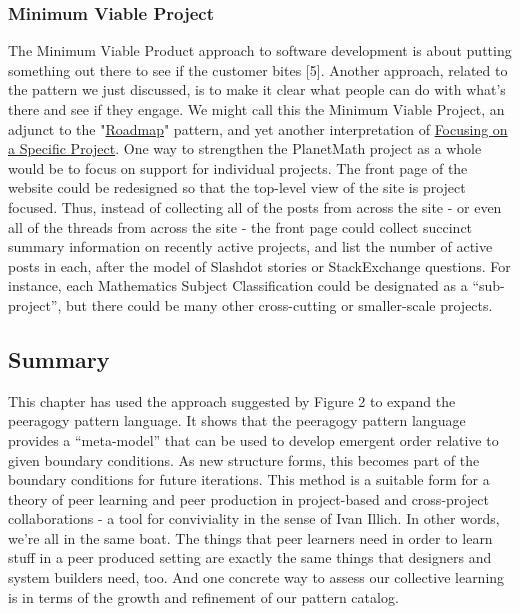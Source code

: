 \subsubsection{Minimum Viable Project}

The Minimum Viable Product approach to software development is about
putting something out there to see if the customer bites {[}5{]}.
Another approach, related to the pattern we just discussed, is to make
it clear what people can do with what's there and see if they engage. We
might call this the Minimum Viable Project, an adjunct to the
"\href{http://peeragogy.org/practice/roadmap/}{Roadmap}" pattern, and
yet another interpretation of
\href{http://peeragogy.org/practice/focusing-on-a-specific-project/}{Focusing
on a Specific Project}. One way to strengthen the PlanetMath project as
a whole would be to focus on support for individual projects. The front
page of the website could be redesigned so that the top-level view of
the site is project focused. Thus, instead of collecting all of the
posts from across the site - or even all of the threads from across the
site - the front page could collect succinct summary information on
recently active projects, and list the number of active posts in each,
after the model of Slashdot stories or StackExchange questions. For
instance, each Mathematics Subject Classification could be designated as
a ``sub-project'', but there could be many other cross-cutting or
smaller-scale projects.

\subsection{Summary}

This chapter has used the approach suggested by Figure 2 to expand the
peeragogy pattern language. It shows that the peeragogy pattern language
provides a ``meta-model'' that can be used to develop emergent order
relative to given boundary conditions. As new structure forms, this
becomes part of the boundary conditions for future iterations. This
method is a suitable form for a theory of peer learning and peer
production in project-based and cross-project collaborations - a tool
for conviviality in the sense of Ivan Illich. In other words, we're all
in the same boat. The things that peer learners need in order to learn
stuff in a peer produced setting are exactly the same things that
designers and system builders need, too. And one concrete way to assess
our collective learning is in terms of the growth and refinement of our
pattern catalog.

